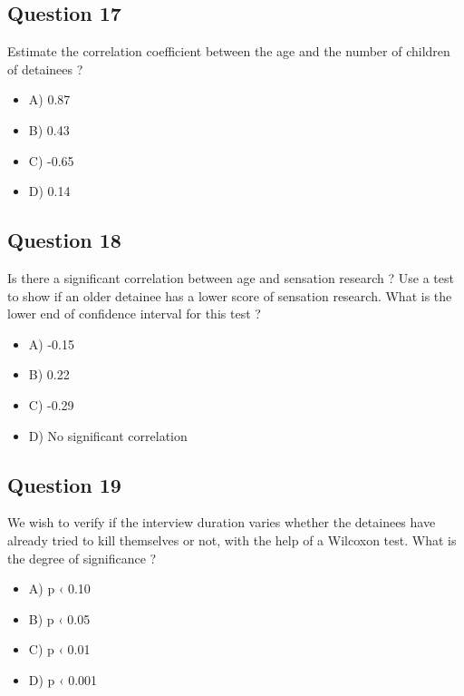 \documentclass[11pt]{article}
\begin{document}
\subsection*{Question 17}
\label{sec:org01bec1f}
Estimate the correlation coefficient between the age and the number of children
of detainees ?
\begin{itemize}
\item A) 0.87

\item B) 0.43

\item C) -0.65

\item D) 0.14
\end{itemize}

\subsection*{Question 18}
\label{sec:org525b15a}
Is there a significant correlation between age and sensation research ? Use a
test to show if an older detainee has a lower score of sensation research. What
is the lower end of confidence interval for this test ?
\begin{itemize}
\item A) -0.15

\item B) 0.22

\item C) -0.29

\item D) No significant correlation
\end{itemize}

\subsection*{Question 19}
\label{sec:org7ea0168}
We wish to verify if the interview duration varies whether the detainees have
already tried to kill themselves or not, with the help of a Wilcoxon test. What
is the degree of significance ?

\begin{itemize}
\item A) p ‹ 0.10

\item B) p ‹ 0.05

\item C) p ‹ 0.01

\item D) p ‹ 0.001
\end{itemize}
\end{document}

